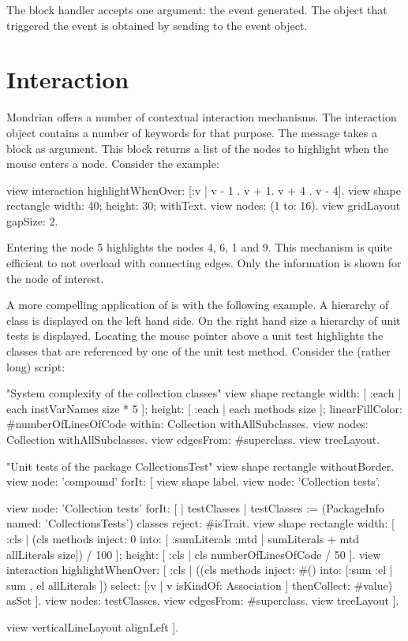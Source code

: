 \documentclass[a4paper,10pt,twoside]{book}
\begin{document}
The block handler accepts one argument: the event generated. The object that triggered the event is obtained by sending  to the event object. 


\section{Interaction}
Mondrian offers a number of contextual interaction mechanisms. The interaction object contains a number of keywords for that purpose. The message  takes a block as argument. This block returns a list of the nodes to highlight when the mouse enters a node. Consider the example:

\begin{code}{}
view interaction 
  highlightWhenOver: [:v | {v - 1 . v + 1. v + 4 . v - 4}].
view shape rectangle 
  width: 40;
  height: 30;
  withText.
view nodes: (1 to: 16).
view gridLayout gapSize: 2.
\end{code}

Entering the node 5 highlights the nodes 4, 6, 1 and 9. This mechanism is quite efficient to not overload with connecting edges. Only the information is shown for the node of interest. 

A more compelling application of  is with the following example. A hierarchy of class is displayed on the left hand side. On the right hand size a hierarchy of unit tests is displayed. Locating the mouse pointer above a unit test highlights the classes that are referenced by one of the unit test method. Consider the (rather long) script:

\begin{code}{}
"System complexity of the collection classes"
view shape rectangle
  width: [ :each | each instVarNames size * 5 ];
  height: [ :each | each methods size ];
  linearFillColor: #numberOfLinesOfCode within: Collection withAllSubclasses.
view nodes: Collection withAllSubclasses.
view edgesFrom: #superclass.
view treeLayout.

"Unit tests of the package CollectionsTest"
view shape rectangle withoutBorder.
view node: 'compound' forIt: [
  view shape label.
  view node: 'Collection tests'.
  
  view node: 'Collection tests' forIt: [
    | testClasses |
    testClasses := (PackageInfo named: 'CollectionsTests') classes reject: #isTrait.
    view shape rectangle
      width: [ :cls | (cls methods inject: 0 into: [ :sumLiterals :mtd | sumLiterals + mtd allLiterals size]) / 100 ];
      height: [ :cls | cls numberOfLinesOfCode / 50 ].
    view interaction 
        highlightWhenOver: [ :cls | ((cls methods inject: #() 
                        into: [:sum :el | sum , el allLiterals ]) select: [:v | v isKindOf: Association ] thenCollect: #value) asSet ].
    view nodes: testClasses.
    view edgesFrom: #superclass.
    view treeLayout ].
  
  view verticalLineLayout alignLeft
].
\end{code}
\end{document}
